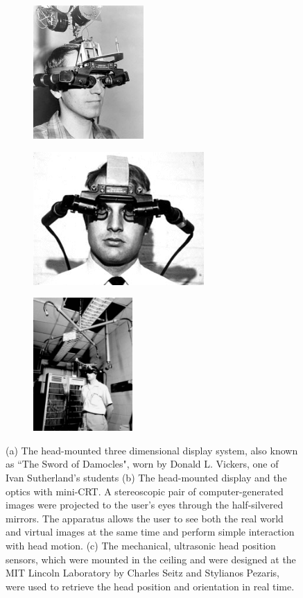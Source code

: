 \begin{figure}[t]
\centering
\begin{subfigure}[t]{1.75in}
  \centering
  \includegraphics[height=2.0in]{ch1/figures/sutherland/3.jpeg}
  \caption{}
  \label{ivansetup1}
\end{subfigure}
\begin{subfigure}[t]{2.6in}
  \centering
  \includegraphics[height=2.0in]{ch1/figures/sutherland/2.jpeg}
  \caption{}
  \label{ivansetup2}
\end{subfigure}
\begin{subfigure}[t]{1.4in}
  \centering
  \includegraphics[height=2.0in]{ch1/figures/sutherland/1.jpeg}
  \caption{}
  \label{ivansetup3}
\end{subfigure}
\caption{(a) The head-mounted three dimensional display system, also known as ``The Sword of 
Damocles", worn by Donald L. Vickers, one of Ivan Sutherland's students (b) The head-mounted 
display and the optics with mini-CRT. A stereoscopic pair of computer-generated images were 
projected to the user's eyes through the half-silvered mirrors. The apparatus allows the user to see 
both the real world and virtual images at the same time and perform simple interaction with head 
motion. (c) The mechanical, ultrasonic head position sensors, which were mounted in the ceiling and 
were designed at the MIT Lincoln Laboratory by Charles Seitz and Stylianos Pezaris, were used to 
retrieve the head position and orientation in real time.}
\label{ivanfullsetup}
\end{figure}

